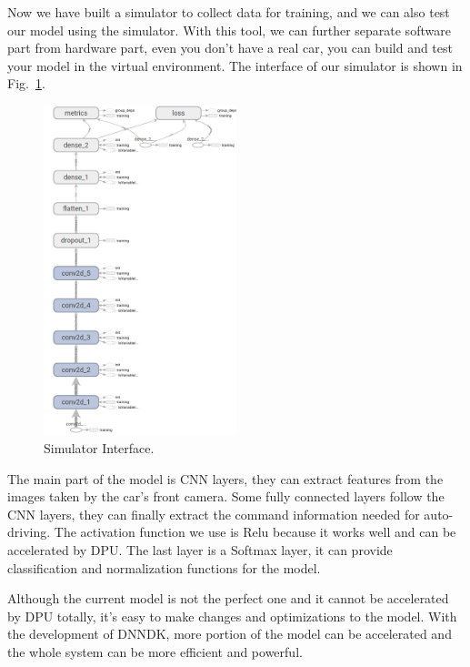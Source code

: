 \documentclass[conference]{IEEEtran}
\begin{document}
Now we have built a simulator to collect data for training, and we can also test our model using the simulator. With this tool, we can further separate software part from hardware part, even you don't have a real car, you can build and test your model in the virtual environment. The interface of our simulator is shown in Fig.~\ref{si}.  

\begin{figure}[htbp]
\centerline{\includegraphics[width=0.5\textwidth]{net-structure.png}}
\caption{Simulator Interface.}
\label{si}
\end{figure}

The main part of the model is CNN layers, they can extract features from the images taken by the car's front camera. Some fully connected layers follow the CNN layers, they can finally extract the command information needed for auto-driving. The activation function we use is Relu because it works well and can be accelerated by DPU. The last layer is a Softmax layer, it can provide classification and normalization functions for the model.  

Although the current model is not the perfect one and it cannot be accelerated by DPU totally, it's easy to make changes and optimizations to the model. With the development of DNNDK, more portion of the model can be accelerated and the whole system can be more efficient and powerful.
\end{document}
